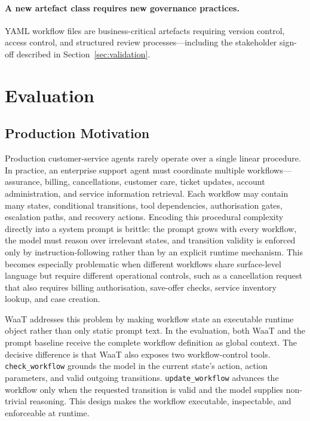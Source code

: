 \documentclass[10pt,conference]{IEEEtran}
\begin{document}
\paragraph{A new artefact class requires new governance practices.}
YAML workflow files are business-critical artefacts requiring
version control, access control, and structured review
processes---including the stakeholder sign-off described in
Section~\ref{sec:validation}.


\section{Evaluation}
\label{sec:evaluation}

\subsection{Production Motivation}

Production customer-service agents rarely operate over a single
linear procedure.  In practice, an enterprise support agent must
coordinate multiple workflows---assurance, billing, cancellations,
customer care, ticket updates, account administration, and service
information retrieval.  Each workflow may contain many states,
conditional transitions, tool dependencies, authorisation gates,
escalation paths, and recovery actions.  Encoding this procedural
complexity directly into a system prompt is brittle: the prompt
grows with every workflow, the model must reason over irrelevant
states, and transition validity is enforced only by
instruction-following rather than by an explicit runtime mechanism.
This becomes especially problematic when different workflows share
surface-level language but require different operational controls,
such as a cancellation request that also requires billing
authorisation, save-offer checks, service inventory lookup, and
case creation.

WaaT addresses this problem by making workflow state an executable
runtime object rather than only static prompt text.  In the
evaluation, both WaaT and the prompt baseline receive the complete
workflow definition as global context.  The decisive difference is
that WaaT also exposes two workflow-control tools.
\texttt{check\_workflow} grounds the model in the current state's
action, action parameters, and valid outgoing transitions.
\texttt{update\_workflow} advances the workflow only when the
requested transition is valid and the model supplies non-trivial
reasoning.  This design makes the workflow executable,
inspectable, and enforceable at runtime.
\end{document}
